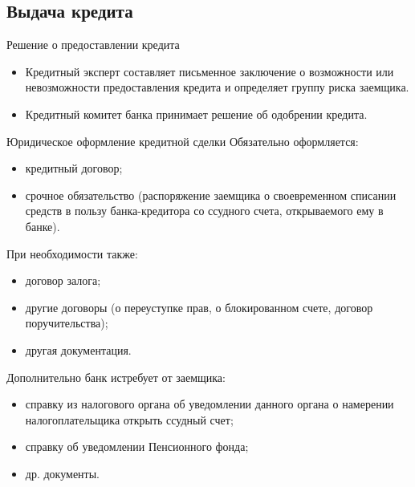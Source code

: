 \documentclass[_Banking_p2.tex]{subfiles}
\begin{document}
\subsection{Выдача кредита}
\begin{frame}{Решение о предоставлении кредита}
\begin{itemize}
	\item Кредитный эксперт составляет письменное заключение о возможности или невозможности предоставления кредита и определяет группу риска заемщика.
	\item Кредитный комитет банка принимает решение об одобрении кредита.
\end{itemize}
\end{frame}

\begin{frame}[ allowframebreaks ]{Юридическое оформление кредитной сделки}
Обязательно оформляется:
\begin{itemize}
	\item кредитный договор;
	\item срочное обязательство (распоряжение заемщика о своевременном списании средств в пользу банка-кредитора со ссудного счета, открываемого ему в банке).
\end{itemize}

При необходимости также:
\begin{itemize}
	\item договор залога;
	\item другие договоры (о переуступке прав, о блокированном счете, договор поручительства);
	\item другая документация.
\end{itemize}

\pagebreak
Дополнительно банк истребует от заемщика:
\begin{itemize}
	\item справку из налогового органа об уведомлении данного органа о намерении налогоплательщика открыть ссудный счет;
	\item справку об уведомлении Пенсионного фонда;
	\item др. документы.
\end{itemize}
\end{frame}
\end{document}
